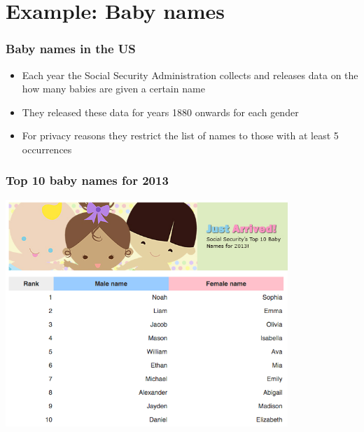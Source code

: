 \documentclass[slidestop,compress,mathserif,12pt,t,professionalfonts,xcolor=table]{beamer}
\begin{document}

\section{Example: Baby names}


\begin{frame}
\frametitle{Baby names in the US}

\begin{itemize}

\item Each year the Social Security Administration collects and releases data on the how many babies are given a certain name

\item They released these data for years 1880 onwards for each gender

\item For privacy reasons they restrict the list of names to those with at least 5 occurrences

\end{itemize}

\end{frame}


\begin{frame}
\frametitle{Top 10 baby names for 2013}

\begin{center}
\includegraphics[width=0.8\textwidth]{figures/babynames2013}
\end{center}


\end{frame}
\end{document}
